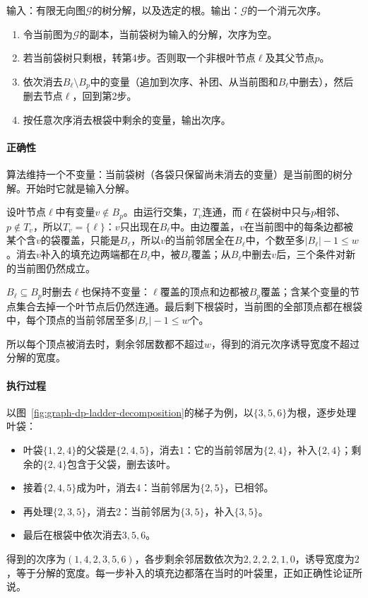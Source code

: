 \begin{algorithm}[由树分解读出消元次序]
\label{alg:graph-dp-decomposition-to-order}
输入：有限无向图$\mathcal G$的树分解，以及选定的根。输出：$\mathcal G$的一个消元次序。
\begin{enumerate}
  \item 令当前图为$\mathcal G$的副本，当前袋树为输入的分解，次序为空。
  \item 若当前袋树只剩根，转第4步。否则取一个非根叶节点$\ell$及其父节点$p$。
  \item 依次消去$B_\ell\setminus B_p$中的变量（追加到次序、补团、从当前图和$B_\ell$中删去），然后删去节点$\ell$，回到第2步。
  \item 按任意次序消去根袋中剩余的变量，输出次序。
\end{enumerate}
\end{algorithm}

\paragraph{正确性}
算法维持一个不变量：当前袋树（各袋只保留尚未消去的变量）是当前图的树分解。开始时它就是输入分解。

设叶节点$\ell$中有变量$v\notin B_p$。由运行交集，$T_v$连通，而$\ell$在袋树中只与$p$相邻、$p\notin T_v$，所以$T_v=\{\ell\}$：$v$只出现在$B_\ell$中。由边覆盖，$v$在当前图中的每条边都被某个含$v$的袋覆盖，只能是$B_\ell$，所以$v$的当前邻居全在$B_\ell$中，个数至多$|B_\ell|-1\leq w$。消去$v$补入的填充边两端都在$B_\ell$中，被$B_\ell$覆盖；从$B_\ell$中删去$v$后，三个条件对新的当前图仍然成立。

$B_\ell\subseteq B_p$时删去$\ell$也保持不变量：$\ell$覆盖的顶点和边都被$B_p$覆盖；含某个变量的节点集合去掉一个叶节点后仍然连通。最后剩下根袋时，当前图的全部顶点都在根袋中，每个顶点的当前邻居至多$|B_r|-1\leq w$个。

所以每个顶点被消去时，剩余邻居数都不超过$w$，得到的消元次序诱导宽度不超过分解的宽度。

\paragraph{执行过程}
以图~\ref{fig:graph-dp-ladder-decomposition}的梯子为例，以$\{3,5,6\}$为根，逐步处理叶袋：
\begin{itemize}
  \item 叶袋$\{1,2,4\}$的父袋是$\{2,4,5\}$，消去$1$：它的当前邻居为$\{2,4\}$，补入$\{2,4\}$；剩余的$\{2,4\}$包含于父袋，删去该叶。
  \item 接着$\{2,4,5\}$成为叶，消去$4$：当前邻居为$\{2,5\}$，已相邻。
  \item 再处理$\{2,3,5\}$，消去$2$：当前邻居为$\{3,5\}$，补入$\{3,5\}$。
  \item 最后在根袋中依次消去$3,5,6$。
\end{itemize}

得到的次序为$(1,4,2,3,5,6)$，各步剩余邻居数依次为$2,2,2,2,1,0$，诱导宽度为$2$，等于分解的宽度。每一步补入的填充边都落在当时的叶袋里，正如正确性论证所说。
